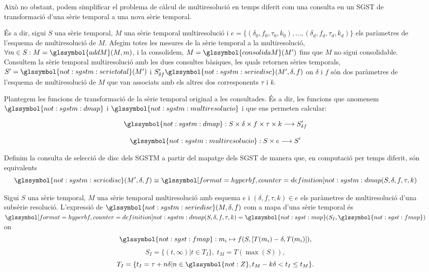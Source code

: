 Això no obstant, podem simplificar el problema de càlcul de
multiresolució en temps diferit com una consulta en un \gls{SGST} de
transformació d'una sèrie temporal a una nova sèrie temporal.

És a dir, sigui $S$ una sèrie temporal, $M$ una sèrie temporal
multiresolució i $e = \{ (\delta_0,f_0,\tau_0,k_0), \ldots,
(\delta_d,f_d,\tau_d,k_d)\}$ els paràmetres de l'esquema de
multiresolució de $M$. Afegim totes les mesures de la sèrie temporal a
la multiresolució, $\forall m \in S:
M=\glssymbol{addM}(M,m)$, i la consolidem, $M=\glssymbol{consolidaM}(M')$ fins que
$M$ no sigui consolidable. Consultem la sèrie temporal multiresolució
amb les dues consultes bàsiques, les quals retornen sèries temporals,
$S'=\glssymbol{not:sgstm:serietotal}(M')$ i $S_{\delta
  f}'\glssymbol{not:sgstm:seriedisc}(M',\delta,f)$ on $\delta$ i $f$
són dos paràmetres de l'esquema de multiresolució de $M$ que van
associats amb els altres dos corresponents $\tau$ i $k$.



Plantegem les funcions de transformació de la sèrie temporal original
a les consultades. És a dir, les funcions que anomenem
$\glssymbol{not:sgstm:dmap}$ i $\glssymbol{not:sgstm:multiresolucio}$
i que ens permeten calcular:

\[
\glssymbol{not:sgstm:dmap}: S \times \delta \times f \times \tau \times k \longrightarrow
S'_{\delta f}
\]


\[
 \glssymbol{not:sgstm:multiresolucio}: S \times e  \longrightarrow S'
\]



Definim la consulta de selecció de disc dels \gls{SGSTM} a partir del
mapatge dels \gls{SGST} de manera que, en computació per temps
diferit, són equivalents
\[
\glssymbol{not:sgstm:seriedisc}(M',\delta,f) \equiv
\glssymboldef{not:sgstm:dmap}(S,\delta,f,\tau,k)
\]


\begin{definition}
  Sigui $S$ una sèrie temporal, $M$ una sèrie temporal multiresolució
  amb esquema $e$ i $(\delta,f,\tau,k)\in e$ els paràmetres de
  multiresolució d'una subsèrie resolució. L'expressió de
  $\glssymbol{not:sgstm:seriedisc}(M,\delta,f)$ com a mapa d'una sèrie
  temporal és $\glssymboldef{not:sgstm:dmap}(S,\delta,f,\tau,k)=
  \glssymbol{not:sgst:map}(S_I,\glssymbol{not:sgst:fmap})$ on
  \[
  \glssymbol{not:sgst:fmap}: m_i\mapsto f(S, [T(m_i)-\delta,T(m_i)]),
  \]
  \[
  S_I = \{ (t,\infty) | t\in T_I  \},\;  t_M = T(\max(S)),
  \]
  \[
  T_I = \{ t_I = \tau+n\delta | n\in\glssymbol{not:Z}, t_M - k\delta <
  t_I \leq t_M \}.
  \]
\end{definition}



